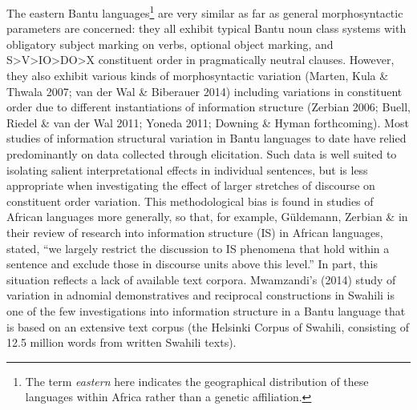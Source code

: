 \documentclass[output=paper]{langsci/langscibook}
\begin{document}
The eastern Bantu languages\footnote{The term \textit{e}\textit{astern} here indicates the geographical distribution of these languages within Africa rather than a genetic affiliation.} are very similar as far as general morphosyntactic parameters are concerned: they all exhibit typical Bantu noun class systems with obligatory subject marking on verbs, optional object marking, and S{\textgreater}V{\textgreater}IO{\textgreater}DO{\textgreater}X constituent order in pragmatically neutral clauses. However, they also exhibit various kinds of morphosyntactic variation (Marten, Kula \& Thwala 2007; van der Wal \& Biberauer 2014) including variations in constituent order due to different instantiations of information structure (Zerbian 2006; Buell, Riedel \& van der Wal 2011; Yoneda 2011; Downing \& Hyman forthcoming). Most studies of information structural variation in Bantu languages to date have relied predominantly on data collected through elicitation. Such data is well suited to isolating salient interpretational effects in individual sentences, but is less appropriate when investigating the effect of larger stretches of discourse on constituent order variation. This methodological bias is found in studies of African languages more generally, so that, for example, Güldemann, Zerbian \& \citet[157]{Zimmermann2015} in their review of research into information structure (IS) in African languages, stated, “we largely restrict the discussion to IS phenomena that hold within a sentence and exclude those in discourse units above this level.” In part, this situation reflects a lack of available text corpora. Mwamzandi’s (2014) study of variation in adnomial demonstratives and reciprocal constructions in Swahili is one of the few investigations into information structure in a Bantu language that is based on an extensive text corpus (the Helsinki Corpus of Swahili, consisting of 12.5 million words from written Swahili texts).
\end{document}
